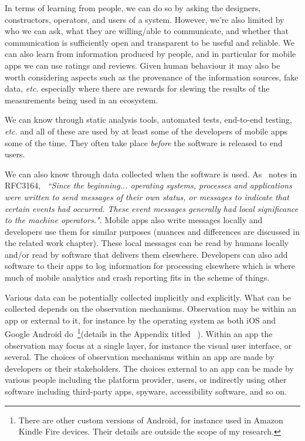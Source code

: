 In terms of learning from people, we can do so by asking the designers, constructors, operators, and users of a system. However, we're also limited by who we can ask, what they are willing/able to communicate, and whether that communication is sufficiently open and transparent to be useful and reliable. We can also learn from information produced by people, and in particular for mobile apps we can use ratings and reviews. Given human behaviour it may also be worth considering aspects such as the provenance of the information sources, fake data, \emph{etc.} especially where there are rewards for slewing the results of the measurements being used in an ecosystem. 

We can know through static analysis tools, automated tests, end-to-end testing, \emph{etc.} and all of these are used by at least some of the developers of mobile apps some of the time. They often take place \textit{before} the software is released to end users.

We can also know through data collected when the software is used. As~\cite{RFC3164} notes in RFC3164, ~\emph{``Since the beginning... operating systems, processes and applications were written to send messages of their own status, or messages to indicate that certain events had occurred. These event messages generally had local significance to the machine operators."}. Mobile apps also write messages locally and developers use them for similar purposes (nuances and differences are discussed in the related work chapter). These local messages can be read by humans locally and/or read by software that delivers them elsewhere. Developers can also add software to their apps to log information for processing elsewhere which is where much of mobile analytics and crash reporting fits in the scheme of things.

Various data can be potentially collected implicitly and explicitly. What can be collected depends on the observation mechanisms. Observation may be within an app or external to it, for instance by the operating system as both iOS  and Google Android do~\footnote{There are other custom versions of Android, for instance used in Amazon Kindle Fire devices. Their details are outside the scope of my research.}(details in the Appendix titled~\href{chapter-on-mobile-analytics}{\emph{}} ). Within an app the observation may focus at a single layer, for instance the visual user interface, or several. The choices of observation mechanisms within an app are made by developers or their stakeholders. The choices external to an app can be made by various people including the platform provider, users, or indirectly using other software including third-party apps, spyware, accessibility software, and so on.

